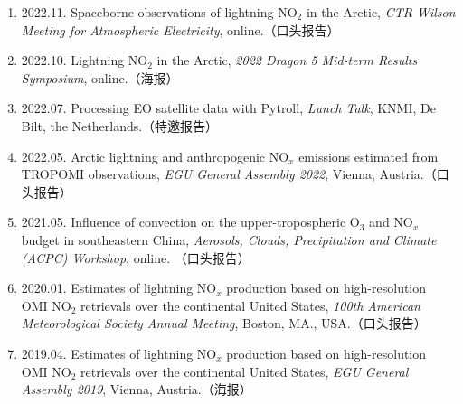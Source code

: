 \begin{enumerate}[label={（\arabic*）}, leftmargin=20pt, widest=0, itemindent=*, topsep=0pt, partopsep=0pt, parsep=0pt]

\item 2022.11. Spaceborne observations of lightning NO$_2$ in the Arctic,
                \emph{CTR Wilson Meeting for Atmospheric Electricity},
                online.（口头报告）

\item 2022.10. Lightning NO$_2$ in the Arctic,
                \emph{2022 Dragon 5 Mid-term Results Symposium},
                online.（海报）

\item 2022.07. Processing EO satellite data with Pytroll,
                \emph{Lunch Talk},
                KNMI, De Bilt, the Netherlands.（特邀报告）

\item 2022.05. Arctic lightning and anthropogenic NO$_x$ emissions estimated from TROPOMI observations,
                \emph{EGU General Assembly 2022},
                Vienna, Austria.（口头报告）

\item 2021.05. Influence of convection on the upper-tropospheric O$_3$ and NO$_x$ budget in southeastern China,
                \emph{Aerosols, Clouds, Precipitation and Climate (ACPC) Workshop},
                online. （口头报告）

\item 2020.01. Estimates of lightning NO$_x$ production based on high-resolution OMI NO$_2$ retrievals over the continental United States,
                \emph{100th American Meteorological Society Annual Meeting},
                Boston, MA., USA.（口头报告）

\item 2019.04. Estimates of lightning NO$_x$ production based on high-resolution OMI NO$_2$ retrievals over the continental United States,
                \emph{EGU General Assembly 2019},
                Vienna, Austria.（海报）

\end{enumerate}

